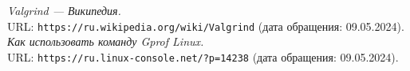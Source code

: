 \begin{thebibliography}{99}
{\itshape Valgrind — Википедия.} \\URL: \texttt{https://ru.wikipedia.org/wiki/Valgrind} (дата обращения: 09.05.2024).
{\itshape Как использовать команду Gprof Linux.} \\URL: \texttt{https://ru.linux-console.net/?p=14238} (дата обращения: 09.05.2024).
\end{thebibliography}
\pagebreak

